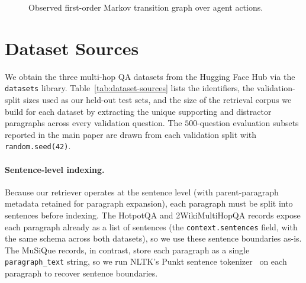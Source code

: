 \documentclass[11pt]{article}
\begin{document}
\begin{figure}[ht]
\caption{Observed first-order Markov transition graph over agent actions.}
\label{fig:transition-graph}
\end{figure}

\section{Dataset Sources}
\label{app:datasets}

We obtain the three multi-hop QA datasets from the Hugging Face Hub via the \texttt{datasets} library. Table~\ref{tab:dataset-sources} lists the identifiers, the validation-split sizes used as our held-out test sets, and the size of the retrieval corpus we build for each dataset by extracting the unique supporting and distractor paragraphs across every validation question. The $500$-question evaluation subsets reported in the main paper are drawn from each validation split with \texttt{random.seed(42)}.

\paragraph{Sentence-level indexing.} Because our retriever operates at the sentence level (with parent-paragraph metadata retained for paragraph expansion), each paragraph must be split into sentences before indexing. The HotpotQA and 2WikiMultiHopQA records expose each paragraph already as a list of sentences (the \texttt{context.sentences} field, with the same schema across both datasets), so we use these sentence boundaries as-is. The MuSiQue records, in contrast, store each paragraph as a single \texttt{paragraph\_text} string, so we run NLTK's Punkt sentence tokenizer~\cite{loper2002nltk} on each paragraph to recover sentence boundaries.
\end{document}
